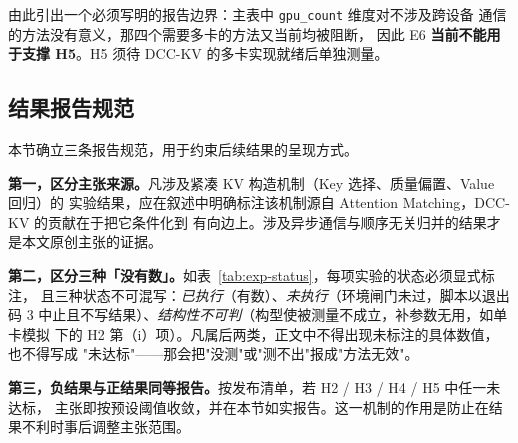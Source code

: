 由此引出一个必须写明的报告边界：主表中 \texttt{gpu\_count} 维度对不涉及跨设备
通信的方法没有意义，那四个需要多卡的方法又当前均被阻断，
因此 E6 \textbf{当前不能用于支撑 H5}。H5 须待 DCC-KV 的多卡实现就绪后单独测量。

\subsection{结果报告规范}

本节确立三条报告规范，用于约束后续结果的呈现方式。

\textbf{第一，区分主张来源。}凡涉及紧凑 KV 构造机制（Key 选择、质量偏置、Value 回归）的
实验结果，应在叙述中明确标注该机制源自 Attention Matching，DCC-KV 的贡献在于把它条件化到
有向边上。涉及异步通信与顺序无关归并的结果才是本文原创主张的证据。

\textbf{第二，区分三种「没有数」。}如表~\ref{tab:exp-status}，每项实验的状态必须显式标注，
且三种状态不可混写：\emph{已执行}（有数）、\emph{未执行}（环境闸门未过，脚本以退出码
$3$ 中止且不写结果）、\emph{结构性不可判}（构型使被测量不成立，补参数无用，如单卡模拟
下的 H2 第（i）项）。凡属后两类，正文中不得出现未标注的具体数值，也不得写成
"未达标"——那会把"没测"或"测不出"报成"方法无效"。

\textbf{第三，负结果与正结果同等报告。}按发布清单，若 H2 / H3 / H4 / H5 中任一未达标，
主张即按预设阈值收敛，并在本节如实报告。这一机制的作用是防止在结果不利时事后调整主张范围。

